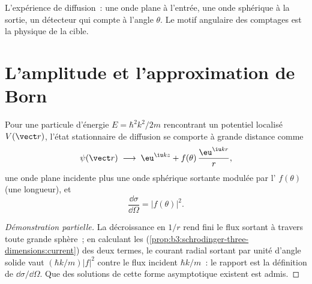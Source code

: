 \begin{omfigure}

{\small L'expérience de diffusion~: une onde plane à l'entrée, une
onde sphérique à la sortie, un détecteur qui compte à l'angle
$\theta$. Le motif angulaire des comptages est la physique de la cible.}
\end{omfigure}

\section{L'amplitude et l'approximation de Born}

\begin{theorem}\label{thm:b3:scattering-theory:amplitude}
Pour une particule d'énergie $E = \hbar^2k^2/2m$ rencontrant un
potentiel localisé $V(\vect r)$, l'état stationnaire de diffusion se
comporte à grande distance comme
\[
\psi(\vect r) \;\longrightarrow\;
\eu^{\iu kz} + f(\theta)\,\frac{\eu^{\iu kr}}{r} ,
\]
une onde plane incidente plus une onde sphérique sortante modulée par
l'\emph{} $f(\theta)$ (une longueur), et
\[
\frac{\dd\sigma}{\dd\Omega} = |f(\theta)|^2 .
\]
\end{theorem}

\begin{proof}[Démonstration partielle]
La décroissance en $1/r$ rend fini le flux sortant à travers toute
grande sphère~; en calculant les 
(\cref{prop:b3:schrodinger-three-dimensions:current}) des deux termes,
le courant radial sortant par unité d'angle solide vaut
$(\hbar k/m)|f|^2$ contre le flux incident $\hbar k/m$~: le rapport
est la définition de $\dd\sigma/\dd\Omega$. Que des solutions de cette
forme asymptotique existent est admis.
\end{proof}

